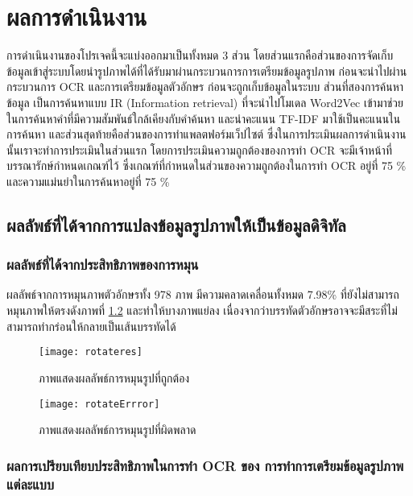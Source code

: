 \chapter{ผลการดำเนินงาน}

การดำเนินงานของโปรเจคนี้จะแบ่งออกมาเป็นทั้งหมด 3 ส่วน โดยส่วนแรกคือส่วนของการจัดเก็บข้อมูลเข้าสู่ระบบโดยนำรูปภาพได้ที่ได้รับมาผ่านกระบวนการการเตรียมข้อมูลรูปภาพ 
ก่อนจะนำไปผ่านกระบวนการ OCR และการเตรียมข้อมูลตัวอักษร ก่อนจะถูกเก็บข้อมูลในระบบ ส่วนที่สองการค้นหาข้อมูล เป็นการค้นหาแบบ IR (Information retrieval) 
ที่จะนำไปโมเดล Word2Vec เข้ามาช่วยในการค้นหาคำที่มีความสัมพันธ์ใกล้เคียงกับคำค้นหา และนำคะแนน TF-IDF มาใช้เป็นคะแนนในการค้นหา และส่วนสุดท้ายคือส่วนของการทำแพลตฟอร์มเว็ปไซต์
ซึ่งในการประเมินผลการดำเนินงานนั้นเราจะทำการประเมินในส่วนแรก โดยการประเมินความถูกต้องของการทำ OCR จะมีเจ้าหน้าที่บรรณารักษ์กำหนดเกณฑ์ไว้ 
ซึ่งเกณฑ์ที่กำหนดในส่วนของความถูกต้องในการทำ OCR อยู่ที่ 75 \% และความแม่นยำในการค้นหาอยู่ที่ 75 \%

\section{ผลลัพธ์ที่ได้จากการแปลงข้อมูลรูปภาพให้เป็นข้อมูลดิจิทัล}

\subsection{ผลลัพธ์ที่ได้จากประสิทธิภาพของการหมุน}
ผลลัพธ์จากการหมุนภาพตัวอักษรทั้ง 978 ภาพ มีความคลาดเคลื่อนทั้งหมด 7.98\% ที่ยังไม่สามารถหมุนภาพให้ตรงดังภาพที่ \ref{fig:rotateErrror} 
และทำให้บางภาพแย่ลง เนื่องจากว่าบรรทัดตัวอักษรอาจจะมีสระที่ไม่สามารถทำกร่อนให้กลายเป็นเส้นบรรทัดได้

\begin{figure}[H]
    \centering
    \texttt{[image: rotateres]}
    \caption{ภาพแสดงผลลัพธ์การหมุนรูปที่ถูกต้อง}\label{fig:rotateres}
\end{figure}

\begin{figure}[H]
    \centering
    \texttt{[image: rotateErrror]}
    \caption{ภาพแสดงผลลัพธ์การหมุนรูปที่ผิดพลาด}\label{fig:rotateErrror}
\end{figure}

\subsection{ผลการเปรียบเทียบประสิทธิภาพในการทำ OCR ของ การทำการเตรียมข้อมูลรูปภาพ แต่ละแบบ}

